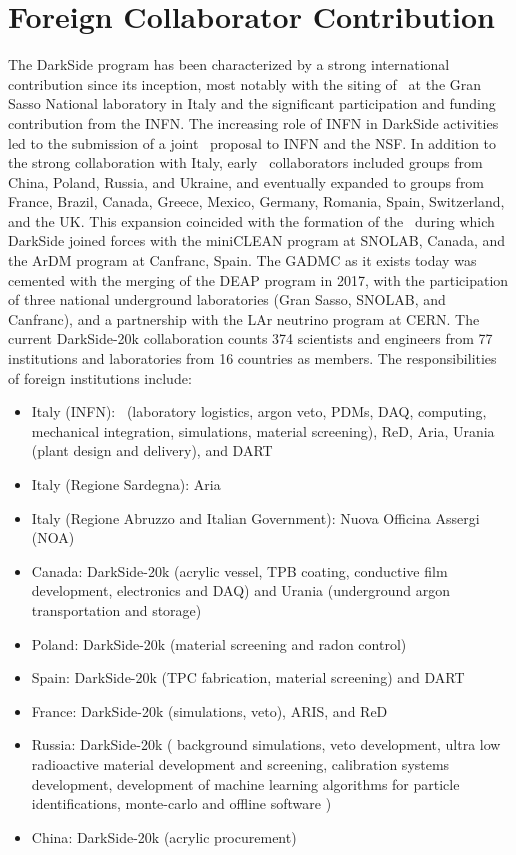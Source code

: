 \section{Foreign Collaborator Contribution}
\label{sec:foreigncollaborators}

The DarkSide program has been characterized by a strong international contribution since its inception, most notably with the siting of \DSfs\ at the Gran Sasso National laboratory in Italy and the significant participation and funding contribution from the INFN. The increasing role of INFN in DarkSide activities led to the submission of a joint \DSks\ proposal to INFN and the NSF. In addition to the strong collaboration with Italy, early \DS\ collaborators included groups from China, Poland, Russia, and Ukraine, and eventually expanded to groups from France, Brazil, Canada, Greece, Mexico, Germany, Romania, Spain, Switzerland,  and the UK. This expansion coincided with the formation of the \GADMC\, during which DarkSide joined forces with the miniCLEAN program at SNOLAB, Canada, and the ArDM program at Canfranc, Spain. The GADMC as it exists today was cemented with the merging of the DEAP program in 2017, with the participation of three national underground laboratories (Gran Sasso, SNOLAB, and Canfranc), and a partnership with the LAr neutrino program at CERN. The current DarkSide-20k collaboration counts 374 scientists and engineers from 77 institutions and laboratories from 16 countries as members. The responsibilities of foreign institutions include:
\begin{itemize}
\item{Italy (INFN)}: \DSks\ (laboratory logistics, argon veto, PDMs, DAQ, computing, mechanical integration, simulations, material screening), ReD, Aria, Urania (plant design and delivery), and DART
\item{Italy (Regione Sardegna)}: Aria
\item{Italy (Regione Abruzzo and Italian Government)}: Nuova Officina Assergi (NOA)
\item{Canada}: DarkSide-20k (acrylic vessel, TPB coating, conductive film development, electronics and DAQ) and Urania (underground argon transportation and storage)
\item{Poland}: DarkSide-20k (material screening and radon control)
\item{Spain}: DarkSide-20k (TPC fabrication, material screening) and DART
\item{France}: DarkSide-20k (simulations, veto), ARIS, and ReD
\item{Russia}: DarkSide-20k ( background simulations, veto development, ultra low radioactive  material development and screening, calibration systems development, development of machine learning algorithms for particle identifications, monte-carlo and offline software )
\item{China}: DarkSide-20k (acrylic procurement)
\end{itemize}

